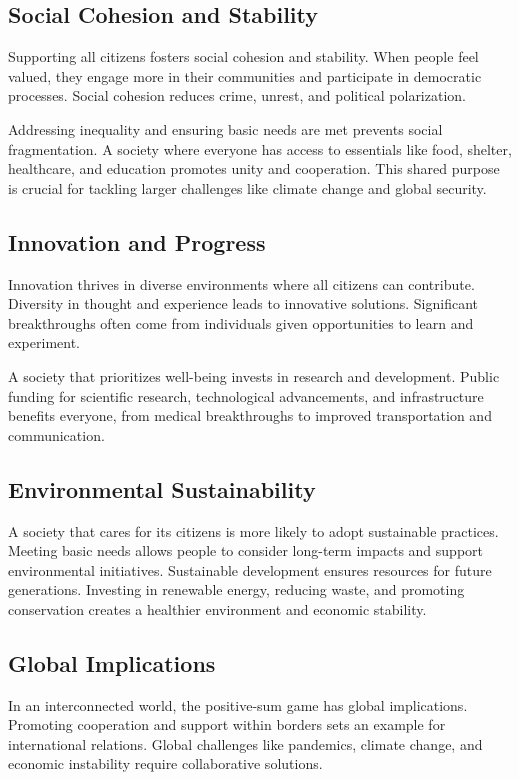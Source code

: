 \subsection*{Social Cohesion and Stability}
Supporting all citizens fosters social cohesion and stability.
When people feel valued, they engage more in their communities and participate in democratic processes.
Social cohesion reduces crime, unrest, and political polarization.

Addressing inequality and ensuring basic needs are met prevents social fragmentation.
A society where everyone has access to essentials like food, shelter, healthcare, and education promotes unity and cooperation.
This shared purpose is crucial for tackling larger challenges like climate change and global security.

\subsection*{Innovation and Progress}
Innovation thrives in diverse environments where all citizens can contribute.
Diversity in thought and experience leads to innovative solutions.
Significant breakthroughs often come from individuals given opportunities to learn and experiment.

A society that prioritizes well-being invests in research and development.
Public funding for scientific research, technological advancements, and infrastructure benefits everyone, from medical breakthroughs to improved transportation and communication.

\subsection*{Environmental Sustainability}
A society that cares for its citizens is more likely to adopt sustainable practices.
Meeting basic needs allows people to consider long-term impacts and support environmental initiatives.
Sustainable development ensures resources for future generations.
Investing in renewable energy, reducing waste, and promoting conservation creates a healthier environment and economic stability.

\subsection*{Global Implications}
In an interconnected world, the positive-sum game has global implications.
Promoting cooperation and support within borders sets an example for international relations.
Global challenges like pandemics, climate change, and economic instability require collaborative solutions.

